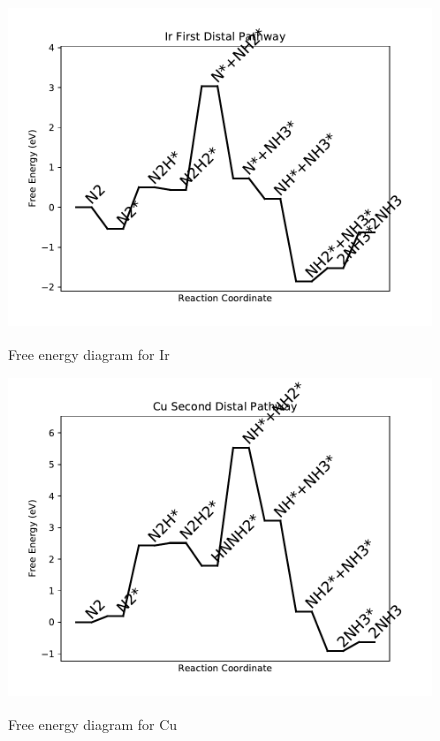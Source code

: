 \documentclass{article}
\begin{document}
\begin{figure}
\includegraphics[width=1\linewidth]{data/plots/Ir_distal_1.pdf}
\label{fig:Ir_distal_1}
\caption{Free energy diagram for Ir}
\end{figure}

\begin{figure}
\includegraphics[width=1\linewidth]{data/plots/Cu_distal_2.pdf}
\label{fig:Cu_distal_2}
\caption{Free energy diagram for Cu}
\end{figure}
\end{document}
